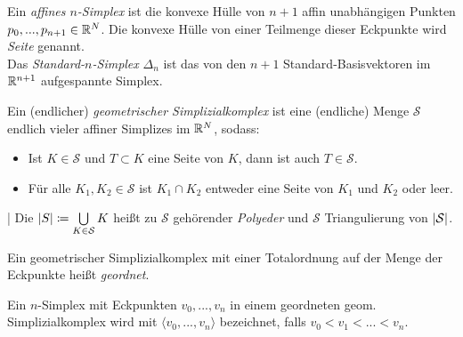 \documentclass{cheat-sheet}
\newcommand{\angles}[1]{\langle #1 \rangle}
\newcommand{\Simpl}{\mathcal{S}} %
\newcommand{\Real}[1]{\abs{#1}} %
\begin{document}






\begin{defn}
  Ein \emph{affines $n$-Simplex} ist die konvexe Hülle von $n+1$ affin unabhängigen Punkten $p_0, ..., p_{n+1} \in \mathbb{R}^N$. Die konvexe Hülle von einer Teilmenge dieser Eckpunkte wird \emph{Seite} genannt.\\
  Das \emph{Standard-$n$-Simplex} $\Delta_n$ ist das von den $n+1$ Standard-Basisvektoren im $\mathbb{R}^{n+1}$ aufgespannte Simplex.
\end{defn}

\begin{defn}
  Ein (endlicher) \emph{geometrischer Simplizialkomplex} ist eine (endliche) Menge $\mathcal{S}$ endlich vieler affiner Simplizes im $\mathbb{R}^N$, sodass:
  \begin{itemize}
    \item Ist $K \in \Simpl$ und $T \subset K$ eine Seite von $K$, dann ist auch $T \in \Simpl$.
    \item Für alle $K_1, K_2 \in \Simpl$ ist $K_1 \cap K_2$ entweder eine Seite von $K_1$ und $K_2$ oder leer.
  \end{itemize}
\end{defn}

\begin{defn}|
  Die $\Real{S} \coloneqq \bigcup_{K \in \Simpl} K$ heißt zu $\Simpl$ gehörender \emph{Polyeder} und $\Simpl$ Triangulierung von $\Real{\Simpl}$.
\end{defn}

\begin{defn}
  Ein geometrischer Simplizialkomplex mit einer Totalordnung auf der Menge der Eckpunkte heißt \emph{geordnet}.
\end{defn}

\begin{nota}
  Ein $n$-Simplex mit Eckpunkten $v_0, ..., v_n$ in einem geordneten geom. Simplizialkomplex wird mit $\angles{v_0, ..., v_n}$ bezeichnet, falls $v_0 < v_1 < ... < v_n$.
\end{nota}
\end{document}

